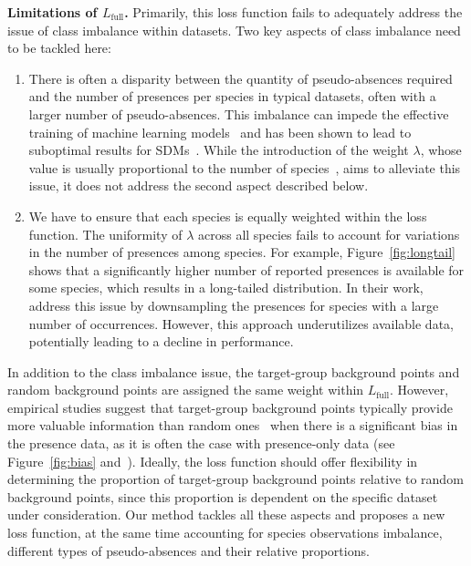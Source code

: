 \documentclass[3p,preprint,12pt]{elsarticle}
\begin{document}
\textbf{Limitations of $L_{\text{full}}$.} Primarily, this loss function fails to adequately address the issue of class imbalance within datasets. Two key aspects of class imbalance need to be tackled here: 
\begin{enumerate}
    \item There is often a disparity between the quantity of pseudo-absences required and the number of presences per species in typical datasets, often with a larger number of pseudo-absences. This imbalance can impede the effective training of machine learning models~\citep{johnson2019classimbalance} and has been shown to lead to suboptimal results for SDMs~\citep{benkendorf2023correcting}. While the introduction of the weight $\lambda$, whose value is usually proportional to the number of species~\citep{mac2019presence, cole2023spatial}, aims to alleviate this issue, it does not address the second aspect described below.
    \item We have to ensure that each species is equally weighted within the loss function. The uniformity of $\lambda$ across all species fails to account for variations in the number of presences among species. For example, Figure~\ref{fig:longtail} shows that a significantly higher number of reported presences is available for some species, which results in a long-tailed distribution. In their work,~\cite{cole2023spatial} address this issue by downsampling the presences for species with a large number of occurrences. However, this approach underutilizes available data, potentially leading to a decline in performance. 
\end{enumerate}

In addition to the class imbalance issue, the target-group background points and random background points are assigned the same weight within $L_{\text{full}}$. However, empirical studies suggest that target-group background points typically provide more valuable information than random ones~\citep{phillips2009sample, botella2020bias} when there is a significant bias in the presence data, as it is often the case with presence-only data (see Figure~\ref{fig:bias} and~\cite{beck2014bias, mesaglio2021overview}). Ideally, the loss function should offer flexibility in determining the proportion of target-group background points relative to random background points, since this proportion is dependent on the specific dataset under consideration. Our method tackles all these aspects and proposes a new loss function, at the same time accounting for species observations imbalance, different types of pseudo-absences and their relative proportions.
\end{document}
